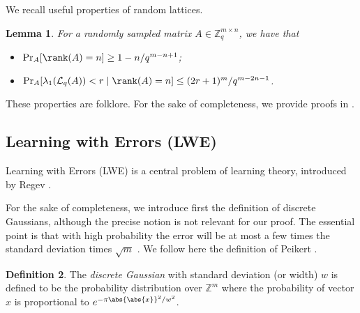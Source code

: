 \documentclass[11pt]{article}
\theoremstyle{definition}
\newtheorem{definition}{Definition}[section]
\theoremstyle{plain}
\newtheorem{lemma}[definition]{Lemma}
\theoremstyle{remark}
\newcommand{\LL}{\mathcal{L}}
\newcommand{\bZ}{\mathbb{Z}}
\let\autocite\cite\let\textcite\citet
\begin{document}
We recall useful properties of random lattices. 

\begin{lemma}\label{lem:random-lattices}
  For a randomly sampled matrix $A \in \bZ_q^{m \times n}$, we have that
  \begin{itemize}
      \item[(i)] $\Pr_A[\rank(A) = n] \geq 1 - {n}/{q^{m-n+1}}$;
      \item[(ii)] $\Pr_A[\lambda_1(\LL_q(A)) < r \mid \rank(A) = n] \leq {(2r+1)^m}/{q^{m-2n-1}}$.
  \end{itemize}
\end{lemma}

These properties are folklore. For the sake of completeness, we provide proofs in .

\subsection{Learning with Errors (\textsc{LWE})}
\label{subsec:lwe}

Learning with Errors (LWE) is a central problem of learning theory, introduced by Regev \cite{regev2009lattices}. 

For the sake of completeness, we introduce first the definition of discrete Gaussians, although the precise notion is not relevant for our proof. The essential point is that with high probability the error will be at most a few times the standard deviation times $\sqrt{m}$ \cite{regev2009lattices, Micciancio2011}. We follow here the definition of Peikert \autocite[Section 2.3]{peikert2016decade}.

\begin{definition}
    The \emph{discrete Gaussian} with standard deviation (or width) $w$ is defined to be the probability distribution over $\bZ^m$ where the probability of vector $x$ is proportional to $e^{-\pi\abs{\abs{x}}^2/w^2}$.
\end{definition}
\end{document}
